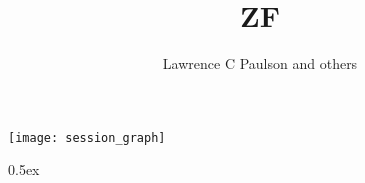 \documentclass[11pt,a4paper]{article}
\begin{document}
\title{ZF}
\author{Lawrence C Paulson and others}
\maketitle

\tableofcontents

\begin{center}
  \texttt{[image: session\_graph]}
\end{center}

\newpage

\renewcommand{\isamarkupheader}[1]%
{\section{\isabellecontext: #1}\markright{THEORY~``\isabellecontext''}}

\parindent 0pt\parskip 0.5ex



%
%
\end{document}
